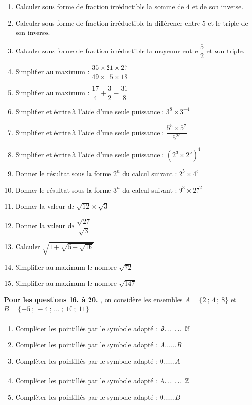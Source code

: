\documentclass[oneside,12pt]{article}          %
\begin{document}
\begin{enumerate}
	\item Calculer sous forme de fraction irréductible la somme de $4$ et de son inverse.
	\item Calculer sous forme de fraction irréductible la différence entre $5$ et le triple de son inverse.
	\item Calculer sous forme de fraction irréductible la moyenne entre $\dfrac{5}{2}$ et son triple.
	\item Simplifier au maximum : $\dfrac{35 \times 21 \times 27}{49 \times 15 \times 18}$
	\item Simplifier au maximum : $\dfrac{17}{4} + \dfrac{3}{2} - \dfrac{31}{8}$
	
	\item Simplifier et écrire à l'aide d'une seule puissance : $3^8 \times 3^{-4}$
	\item Simplifier et écrire à l'aide d'une seule puissance : $\dfrac{5^5 \times 5^7}{5^{20}}$
	\item Simplifier et écrire à l'aide d'une seule puissance : $(2^3 \times 2^5)^4$
	\item Donner le résultat sous la forme $2^n$ du calcul suivant : $2^5 \times 4^4$
	\item Donner le résultat sous la forme $3^n$ du calcul suivant : $9^3 \times 27^2$
	
	\item Donner la valeur de $\sqrt{12} \times \sqrt{3}$
	\item Donner la valeur de $\dfrac{\sqrt{27}}{\sqrt{3}}$
	\item Calculer $\sqrt{1+\sqrt{5+\sqrt{16}}}$
	\item Simplifier au maximum le nombre $\sqrt{72}$
	\item Simplifier au maximum le nombre $\sqrt{147}$
\end{enumerate}

\textbf{Pour les questions 16. à 20.} , on considère les ensembles $A = \{ 2 ~;~ 4 ~;~ 8 \}$ et $B = \{ -5 ~;~ -4 ~;~ \ldots ~;~ 10 ~;~ 11 \}$
\begin{enumerate}[resume*]
	\item Compléter les pointillés par le symbole adapté : $B \ldots\ldots \NN$
	\item Compléter les pointillés par le symbole adapté : $A \ldots\ldots B$
	\item Compléter les pointillés par le symbole adapté : $0 \ldots\ldots A$
	\item Compléter les pointillés par le symbole adapté : $A \ldots\ldots \ZZ$
	\item Compléter les pointillés par le symbole adapté : $0 \ldots\ldots B$
\end{enumerate}
\end{document}
